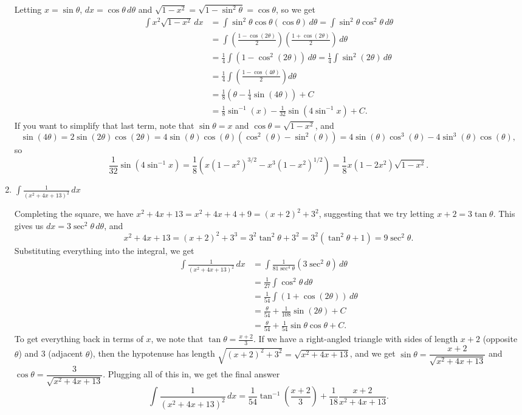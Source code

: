 \documentclass[12pt]{article}
\newcommand{\di}{\displaystyle}
\begin{document}
\begin{enumerate}
Letting $x=\sin\theta$, $dx=\cos\theta\,d\theta$ and $\sqrt{1-x^2}=\sqrt{1-\sin^2\theta} = \cos\theta$, so we get
\begin{align*}
 \int x^2\sqrt{1-x^2}\,dx &= \int \sin^2\theta \cos\theta (\cos\theta)\,d\theta = \int \sin^2\theta\cos^2\theta\,d\theta\\
& = \int \left(\frac{1-\cos(2\theta)}{2}\right)\left(\frac{1+\cos(2\theta)}{2}\right)\,d\theta\\
& = \frac{1}{4}\int (1-\cos^2(2\theta))\,d\theta = \frac{1}{4}\int \sin^2(2\theta)\,d\theta\\
& = \frac{1}{4}\int \left(\frac{1-\cos(4\theta)}{2}\right)d\theta\\
& = \frac{1}{8}\left(\theta -\frac{1}{4}\sin(4\theta)\right)+C\\
& = \frac{1}{8}\sin^{-1}(x)-\frac{1}{32}\sin(4\sin^{-1}x)+C.
\end{align*}
If you want to simplify that last term, note that $\sin \theta = x$ and $\cos \theta = \sqrt{1-x^2}$, and
\[
 \sin(4\theta) = 2\sin(2\theta)\cos(2\theta) = 4\sin(\theta)\cos(\theta)(\cos^2(\theta)-\sin^2(\theta)) = 4\sin(\theta)\cos^3(\theta)-4\sin^3(\theta)\cos(\theta),
\]
so
\[
 \frac{1}{32}\sin(4\sin^{-1}x) = \frac{1}{8}(x(1-x^2)^{3/2}-x^3(1-x^2)^{1/2}) = \frac{1}{8}x(1-2x^2)\sqrt{1-x^2}.
\]


 \item $\di \int \frac{1}{(x^2+4x+13)^2}\,dx$

Completing the square, we have $x^2+4x+13 = x^2+4x+4+9 = (x+2)^2+3^2$, suggesting that we try letting $x+2=3\tan\theta$. This gives us $dx = 3\sec^2\theta\,d\theta$, and
\[
 x^2+4x+13 = (x+2)^2+3^3 = 3^2\tan^2\theta+3^2 = 3^2(\tan^2\theta+1) = 9\sec^2\theta.
\]
Substituting everything into the integral, we get
\begin{align*}
 \int\frac{1}{(x^2+4x+13)^2}\,dx &= \int \frac{1}{81\sec^4\theta}(3\sec^2\theta)\,d\theta\\
 & = \frac{1}{27}\int \cos^2\theta\,d\theta\\
 & = \frac{1}{54}\int (1+\cos(2\theta))\,d\theta\\
 & = \frac{\theta}{54} + \frac{1}{108}\sin(2\theta)+C\\
 & = \frac{\theta}{54} + \frac{1}{54}\sin\theta\cos\theta+C.
\end{align*}
To get everything back in terms of $x$, we note that $\tan\theta = \frac{x+2}{3}$. If we have a right-angled triangle with sides of length $x+2$ (opposite $\theta$) and 3 (adjacent $\theta$), then the hypotenuse has length $\sqrt{(x+2)^2+3^2} = \sqrt{x^2+4x+13}$, and we get $\sin\theta = \dfrac{x+2}{\sqrt{x^2+4x+13}}$ and $\cos\theta = \dfrac{3}{\sqrt{x^2+4x+13}}$. Plugging all of this in, we get the final answer
\[
 \int\frac{1}{(x^2+4x+13)^2}\,dx = \frac{1}{54}\tan^{-1}\left(\frac{x+2}{3}\right) + \frac{1}{18}\frac{x+2}{x^2+4x+13}.
\]



\end{enumerate}
\end{document}
